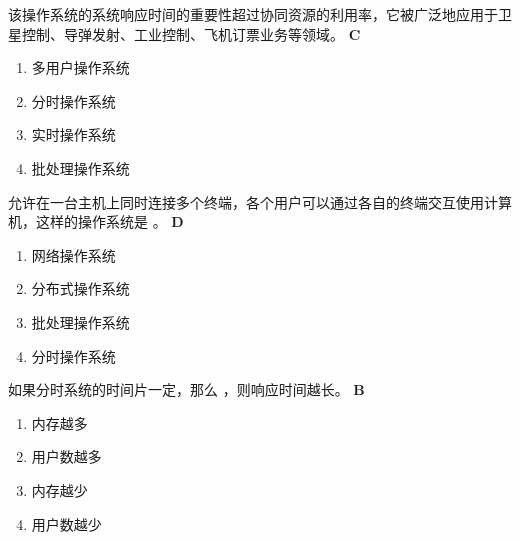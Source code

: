 \begin{problem}
	\myline 该操作系统的系统响应时间的重要性超过协同资源的利用率，它被广泛地应用于卫星控制、导弹发射、工业控制、飞机订票业务等领域。
	\textbf{C}
	\vspace{-0.5em}
	\begin{multicols}{4}
		\begin{enumerate}[label=\Alph*.]
			\item 多用户操作系统
			\item 分时操作系统
			\item 实时操作系统
			\item 批处理操作系统			
		\end{enumerate}
	\end{multicols}
	\vspace{-1em}
\end{problem}


\begin{problem}
	允许在一台主机上同时连接多个终端，各个用户可以通过各自的终端交互使用计算机，这样的操作系统是 \myline 。
	\textbf{D}
	\vspace{-0.5em}
	\begin{multicols}{4}
		\begin{enumerate}[label=\Alph*.]
			\item 网络操作系统
			\item 分布式操作系统
			\item 批处理操作系统
			\item 分时操作系统
		\end{enumerate}
	\end{multicols}
	\vspace{-1em}
\end{problem}


\begin{problem}
	如果分时系统的时间片一定，那么 \myline，则响应时间越长。
	\textbf{B}
	\vspace{-0.5em}
	\begin{multicols}{4}
		\begin{enumerate}[label=\Alph*.]
			\item 内存越多
			\item 用户数越多
			\item 内存越少
			\item 用户数越少
		\end{enumerate}
	\end{multicols}
	\vspace{-1em}
\end{problem}


